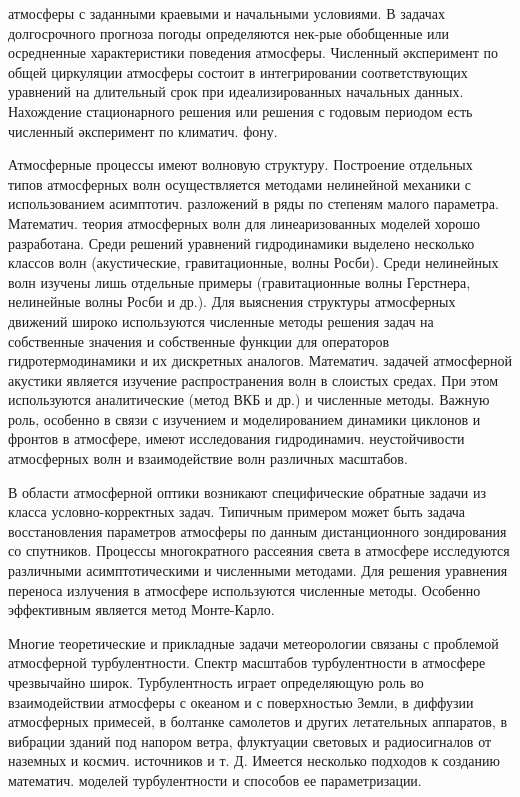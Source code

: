 \documentclass[10pt]{article}
\begin{document}
атмосферы с заданными краевыми и начальными условиями. В задачах долгосрочного прогноза погоды определяются нек-рые обобщенные или осредненные характеристики поведения атмосферы. Численный әксперимент по общей циркуляции атмосферы состоит в интегрировании соответствующих уравнений на длительный срок при идеализированных начальных данных. Нахождение стационарного решения или решения с годовым периодом есть численный әксперимент по климатич. фону.



Атмосферные процессы имеют волновую структуру. Построение отдельных типов атмосферных волн осуществляется методами нелинейной механики с использованием асимптотич. разложений в ряды по степеням малого параметра. Математич. теория атмосферных волн для линеаризованных моделей хорошо разработана. Среди решений уравнений гидродинамики выделено несколько классов волн (акустические, гравитационные, волны Росби). Среди нелинейных волн изучены лишь отдельные примеры (гравитационные волны Герстнера, нелинейные волны Росби и др.). Для выяснения структуры атмосферных движений широко используются численные методы решения задач на собственные значения и собственные функции для операторов гидротермодинамики и их дискретных аналогов. Математич. задачей атмосферной акустики является изучение распространения волн в слоистых средах. При этом используются аналитические (метод ВКБ и др.) и численные методы. Важную роль, особенно в связи с изучением и моделированием динамики циклонов и фронтов в атмосфере, имеют исследования гидродинамич. неустойчивости атмосферных волн и взаимодействие волн различных масштабов.



В области атмосферной оптики возникают специфические обратные задачи из класса условно-корректных задач. Типичным примером может быть задача восстановления параметров атмосферы по данным дистанционного зондирования со спутников. Процессы многократного рассеяния света в атмосфере исследуются различными асимптотическими и численными методами. Для решения уравнения переноса излучения в атмосфере используются численные методы. Особенно эффективным является метод Монте-Карло.



Многие теоретические и прикладные задачи метеорологии связаны с проблемой атмосферной турбулентности. Спектр масштабов турбулентности в атмосфере чрезвычайно широк. Турбулентность играет определяющую роль во взаимодействии атмосферы с океаном и с поверхностью Земли, в диффузии атмосферных примесей, в болтанке самолетов и других летательных аппаратов, в вибрации зданий под напором ветра, флуктуации световых и радиосигналов от наземных и космич. источников и т. Д. Имеется несколько подходов к созданию математич. моделей турбулентности и способов ее параметризации.
\end{document}
